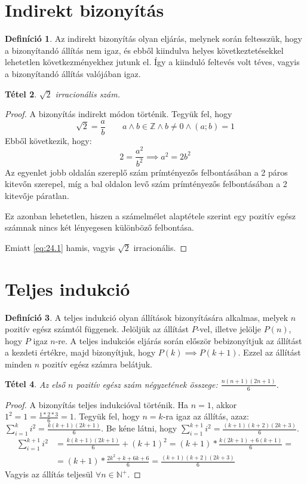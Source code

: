 \documentclass[twoside,12pt]{report}
\newtheorem{theorem}{Tétel}[section]
\theoremstyle{definition}
\newtheorem{definition}[theorem]{Definíció}
\begin{document}
\section{Indirekt bizonyítás}
	\begin{definition}
		Az indirekt bizonyítás olyan eljárás, melynek során feltesszük, hogy a bizonyítandó állítás nem igaz, és ebből kiindulva helyes következtetésekkel lehetetlen következményekhez jutunk el. Így a kiinduló feltevés volt téves, vagyis a bizonyítandó állítás valójában igaz.
	\end{definition}
	\begin{theorem}
		$\sqrt{2}$ irracionális szám.
	\end{theorem}
	\begin{proof}
		A bizonyítás indirekt módon történik. Tegyük fel, hogy 
		\begin{equation}\label{eq:24.1}
		\sqrt{2}=\frac{a}{b}\qquad a\wedge b\in\mathbb{Z}\wedge b\ne0\wedge(a;b)=1
		\end{equation}
		Ebből következik, hogy:
		\begin{equation}
		2=\frac{a^2}{b^2}\implies a^2=2b^2
		\end{equation}
		Az egyenlet jobb oldalán szereplő szám prímtényezős felbontásában a 2 páros kitevőn szerepel, míg a bal oldalon levő szám prímtényezős felbontásában a 2 kitevője páratlan.
		
		Ez azonban lehetetlen, hiszen a számelmélet alaptétele szerint egy pozitív egész számnak
		nincs két lényegesen különböző felbontása. 
		
		Emiatt \eqref{eq:24.1} hamis, vagyis $\sqrt{2}$ irracionális.
	\end{proof}
\section{Teljes indukció}
	\begin{definition}
		A teljes indukció olyan állítások bizonyítására alkalmas, melyek $n$ pozitív egész számtól függenek. Jelöljük az állítást $P$-vel, illetve jelölje $P(n)$, hogy $P$ igaz $n$-re. A teljes indukciós eljárás során először bebizonyítjuk az állítást a kezdeti értékre, majd bizonyítjuk, hogy $P(k)\implies P(k+1)$. Ezzel az állítást minden $n$ pozitív egész számra belátjuk.
	\end{definition}
	\begin{theorem}
		Az első $n$ pozitív egész szám négyzetének összege: $\frac{n(n+1)(2n+1)}{6}$.
	\end{theorem}
	\begin{proof}
		A bizonyítás teljes indukcióval történik. Ha $n=1$, akkor $1^2=1=\frac{1*2*3}{6}=1$. Tegyük fel, hogy $n=k$-ra igaz az állítás, azaz: $\sum_{i=1}^{k} i^2=\frac{k(k+1)(2k+1)}{6}$. Be kéne látni, hogy $\sum_{i=1}^{k+1} i^2=\frac{(k+1)(k+2)(2k+3)}{6}$.
		\begin{align*}
			\sum_{i=1}^{k+1} i^2&=\frac{k(k+1)(2k+1)}{6}+(k+1)^2=(k+1)*\frac{k(2k+1)+6(k+1)}{6}=\\
			&=(k+1)*\frac{2k^2+k+6k+6}{6}=\frac{(k+1)(k+2)(2k+3)}{6}
		\end{align*}
		Vagyis az állítás teljesül $\forall n\in\mathbb{N}^+$.
	\end{proof}
\end{document}
